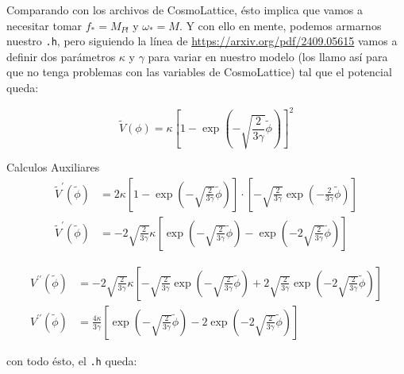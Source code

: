 Comparando con los archivos de CosmoLattice, ésto implica que vamos a necesitar tomar $f_* = M_{Pl}$ y $\omega_* = M$. Y con ello en mente, podemos armarnos nuestro \texttt{.h}, pero siguiendo la línea de \url{https://arxiv.org/pdf/2409.05615} vamos a definir dos parámetros $\kappa$ y $\gamma$ para variar en nuestro modelo (los llamo así para que no tenga problemas con las variables de CosmoLattice) tal que el potencial queda:

\begin{equation}
    \tilde{V} (\phi) = \kappa \left[ 1 - \exp \left( - \sqrt{\frac{2}{3 \gamma}} \tilde{\phi} \right) \right]^2
\end{equation}

\begin{infobox}[ForestGreen]{Calculos Auxiliares}
    \begin{equation*}
        \begin{split}
            \tilde{V}^\prime \left( \tilde{\phi} \right) &= 2 \kappa \left[ 1 - \exp \left( - \sqrt{\frac{2}{3 \gamma}} \tilde{\phi} \right) \right] \cdot \left[ - \sqrt{\frac{2}{3 \gamma}} \exp \left( - \frac{2}{3 \gamma} \tilde{\phi} \right) \right]\\
            \tilde{V}^\prime \left( \tilde{\phi} \right) &= - 2 \sqrt{\frac{2}{3 \gamma}} \kappa \left[ \exp \left( - \sqrt{\frac{2}{3 \gamma}} \tilde{\phi} \right) - \exp \left( - 2 \sqrt{\frac{2}{3 \gamma}} \tilde{\phi} \right) \right]
        \end{split}
    \end{equation*}

    \begin{equation*}
        \begin{split}
            V^{\prime \prime} \left( \tilde{\phi} \right) &= - 2 \sqrt{\frac{2}{3 \gamma}} \kappa \left[ - \sqrt{\frac{2}{3 \gamma}} \exp \left( - \sqrt{\frac{2}{3 \gamma}} \tilde{\phi} \right) + 2 \sqrt{\frac{2}{3 \gamma}} \exp \left( - 2 \sqrt{\frac{2}{3 \gamma}} \tilde{\phi} \right) \right]\\
            V^{\prime \prime} \left( \tilde{\phi} \right) &= \frac{4 \kappa}{3 \gamma} \left[ \exp \left( - \sqrt{\frac{2}{3 \gamma}} \tilde{\phi} \right) - 2 \exp \left( - 2 \sqrt{\frac{2}{3 \gamma}} \tilde{\phi} \right) \right] 
        \end{split}
    \end{equation*}
\end{infobox}

\noindent
con todo ésto, el \texttt{.h} queda:


